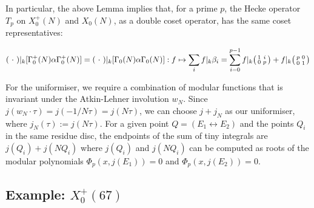 In particular, the above Lemma implies that, for a prime $p$, the Hecke operator $T_p$ on $X_0^+(N)$ and $X_0(N)$, as a double coset operator, has the same coset representatives:

\[
( \ \cdot \ ) |_k [ \Gamma_0^+(N) \alpha \Gamma_0^+(N)] = ( \ \cdot \ ) |_k [ \Gamma_0(N) \alpha \Gamma_0(N)]: f \mapsto \sum_i f |_k \beta_i = \sum_{i=0}^{p-1} f |_k \begin{psmallmatrix} 1 & i \\ 0 & p \end{psmallmatrix} + f|_k \begin{psmallmatrix} p & 0 \\ 0 & 1 \end{psmallmatrix}
\]

For the uniformiser, we require a combination of modular functions that is invariant under the Atkin-Lehner involution $w_N$. Since $j(w_N \cdot \tau) = j(-1/N\tau) = j(N\tau)$, we can choose $j + j_N$ as our uniformiser, where $j_N(\tau) := j(N\tau)$. For a given point $Q = (E_1 \leftrightarrow E_2)$ and the points $Q_i$ in the same residue disc, the endpoints of the sum of tiny integrals are $j(Q_i) + j(NQ_i)$ where $j(Q_i)$ and $j(NQ_i)$ can be computed as roots of the modular polynomials $\Phi_p(x,j(E_1)) = 0$ and $\Phi_p(x,j(E_2)) = 0$.

\subsection{Example: $X_0^+(67)$}

